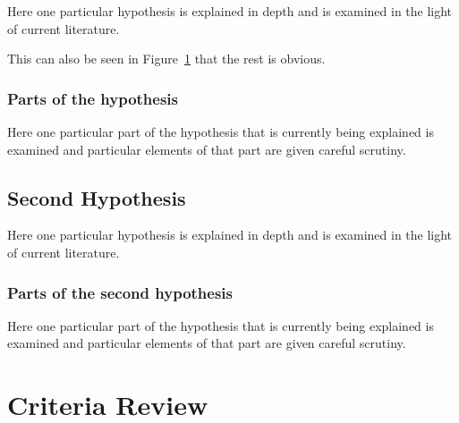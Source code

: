 Here one particular hypothesis is explained in depth
and is examined in the light of current literature.

This can also be seen in Figure~\ref{moon} that the
rest is obvious.

\begin{figure}[h!tb] \centering

\vspace{ 2 in}
\label{moon}
\end{figure}

\subsubsection{Parts of the hypothesis}

Here one particular part of the hypothesis that is 
currently being explained is examined and particular
elements of that part are given careful scrutiny.


\subsection{Second Hypothesis}

Here one particular hypothesis is explained in depth
and is examined in the light of current literature.

\subsubsection{Parts of the second hypothesis}

Here one particular part of the hypothesis that is 
currently being explained is examined and particular
elements of that part are given careful scrutiny.

\section{Criteria Review}

